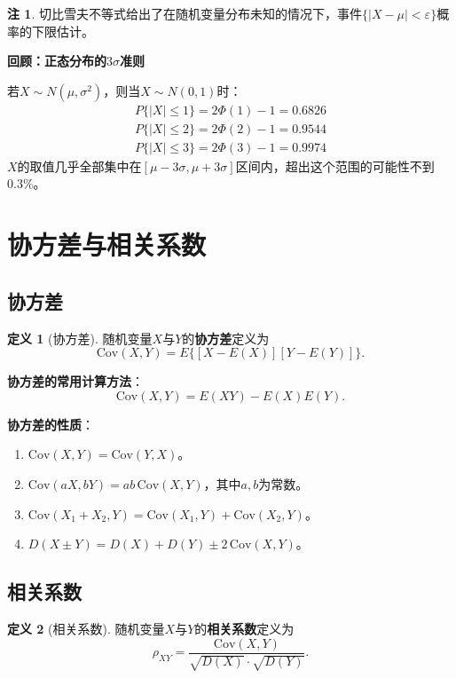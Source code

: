 \documentclass[11pt,a4paper]{report}
\theoremstyle{definition}
\newtheorem{definition}{定义}[chapter]
\newtheorem{remark}{注}[chapter]
\theoremstyle{plain}
\begin{document}
\begin{remark}
切比雪夫不等式给出了在随机变量分布未知的情况下，事件$\{|X-\mu|<\varepsilon\}$概率的下限估计。
\end{remark}

\textbf{回顾：正态分布的$3\sigma$准则}

若$X\sim N(\mu,\sigma^2)$，则当$X\sim N(0,1)$时：
\[
\begin{array}{c}
P\{|X|\leq 1\}=2\Phi(1)-1=0.6826\\[4pt]
P\{|X|\leq 2\}=2\Phi(2)-1=0.9544\\[4pt]
P\{|X|\leq 3\}=2\Phi(3)-1=0.9974
\end{array}
\]
$X$的取值几乎全部集中在$[\mu-3\sigma,\mu+3\sigma]$区间内，超出这个范围的可能性不到$0.3\%$。

\section{协方差与相关系数}

\subsection{协方差}

\begin{definition}[协方差]
随机变量$X$与$Y$的\textbf{协方差}定义为
\[
\mathrm{Cov}(X,Y)=E\big\{[X-E(X)][Y-E(Y)]\big\}.
\]
\end{definition}

\textbf{协方差的常用计算方法}：
\[
\mathrm{Cov}(X,Y)=E(XY)-E(X)E(Y).
\]

\textbf{协方差的性质}：
\begin{enumerate}[label=\arabic*.,leftmargin=2em]
    \item $\mathrm{Cov}(X,Y)=\mathrm{Cov}(Y,X)$。
    \item $\mathrm{Cov}(aX,bY)=ab\,\mathrm{Cov}(X,Y)$，其中$a,b$为常数。
    \item $\mathrm{Cov}(X_1+X_2,Y)=\mathrm{Cov}(X_1,Y)+\mathrm{Cov}(X_2,Y)$。
    \item $D(X\pm Y)=D(X)+D(Y)\pm 2\,\mathrm{Cov}(X,Y)$。
\end{enumerate}

\subsection{相关系数}

\begin{definition}[相关系数]
随机变量$X$与$Y$的\textbf{相关系数}定义为
\[
\rho_{XY}=\frac{\mathrm{Cov}(X,Y)}{\sqrt{D(X)}\cdot\sqrt{D(Y)}}.
\]
\end{definition}
\end{document}
